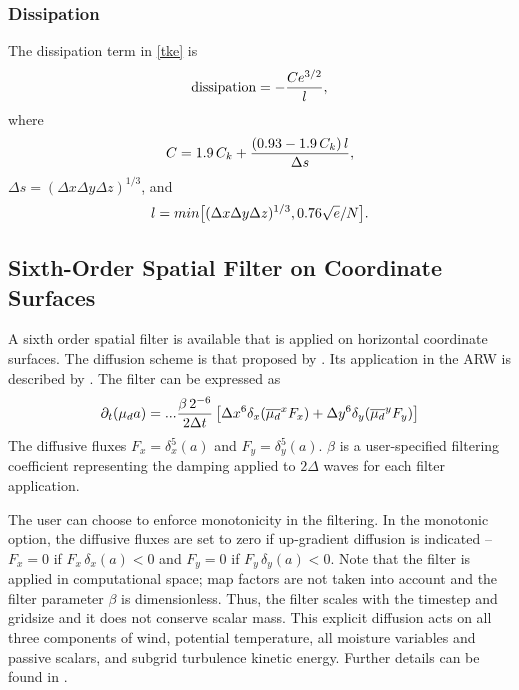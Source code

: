 \subsubsection{Dissipation}

The dissipation term in \eqref{tke} is
%
\begin{equation}
\hbox{dissipation} = - {Ce^{3/2} \over l},
\notag
\end{equation}
%
\noindent
where 
%
\begin{equation}
C = 1.9 \, C_k  + { (0.93 - 1.9 \, C_k)\, l \over \Delta s},
\notag
\end{equation}
%
\noindent
$\Delta s =  (\Delta x \Delta y \Delta z)^{1/3}$,  
and
%
\begin{equation}
l = min\bigl[(\Delta x \Delta y \Delta z)^{1/3}, 0.76 \sqrt{e}/N\bigr].
\notag
\end{equation}

\subsection{Sixth-Order Spatial Filter on Coordinate Surfaces}

A sixth order spatial filter is available that is applied on horizontal
coordinate surfaces.  
The diffusion scheme is that proposed by \cite{xue.2000}.  Its application
in the ARW is described by \cite{knievel.et.al.2007}.  The filter can be
expressed as
%
\begin{equation}
\partial_t (\mu_d a) = ... {\beta \, 2^{-6} \over 2 \Delta t} 
\left[ \Delta x^6 \delta_x (\overline{\mu_d}^x F_x) + \Delta y^6 \delta_y (\overline{\mu_d}^y F_y)\right]
\label{sixth_order_diffusion}
\end{equation}
%
\noindent
The diffusive fluxes $F_x = \delta_x^5 (a)$ and $F_y = \delta_y^5 (a)$.
$\beta$ is a user-specified filtering coefficient representing the
damping applied to $2\Delta$ waves for each filter application.  

The user can choose to enforce monotonicity in the filtering.  In the
monotonic option, the diffusive fluxes are set to zero if up-gradient
diffusion is indicated -- $F_x = 0$ if $F_x \, \delta_x(a) < 0$ and $F_y
= 0$ if $F_y \, \delta_y(a) < 0$.  Note that the filter is applied in
computational space; map factors are not taken into account
and the filter parameter $\beta$ is dimensionless.  Thus, the filter
scales with the timestep and gridsize and it does not conserve scalar
mass.  This explicit diffusion acts on all three components of wind,
potential temperature, all moisture variables and passive scalars, and
subgrid turbulence kinetic energy.  Further details can be found in
\cite{knievel.et.al.2007}.

